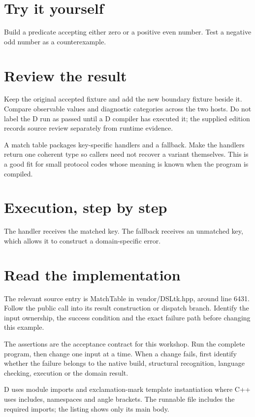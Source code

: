 \section*{Try it yourself}
Build a predicate accepting either zero or a positive even number. Test a negative odd number as a counterexample.

\section*{Review the result}
Keep the original accepted fixture and add the new boundary fixture beside it. Compare observable values and diagnostic categories across the two hosts. Do not label the D run as passed until a D compiler has executed it; the supplied edition records source review separately from runtime evidence.

\clearpage
{}
A match table packages key-specific handlers and a fallback. Make the handlers return one coherent type so callers need not recover a variant themselves. This is a good fit for small protocol codes whose meaning is known when the program is compiled.


\section*{Execution, step by step}
The handler receives the matched key. The fallback receives an unmatched key, which allows it to construct a domain-specific error.

\section*{Read the implementation}
The relevant source entry is MatchTable in vendor/DSLtk.hpp, around line 6431. Follow the public call into its result construction or dispatch branch. Identify the input ownership, the success condition and the exact failure path before changing this example.

The assertions are the acceptance contract for this workshop. Run the complete program, then change one input at a time. When a change fails, first identify whether the failure belongs to the native build, structural recognition, language checking, execution or the domain result.

\clearpage
{}
D uses module imports and exclamation-mark template instantiation where C++ uses includes, namespaces and angle brackets. The runnable file includes the required imports; the listing shows only its main body.

